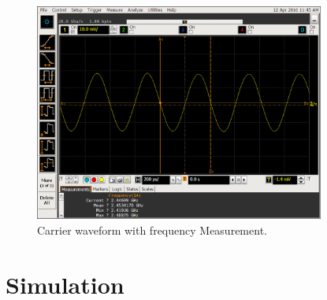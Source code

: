 

\begin{figure}[htbp]
    \centering
    \includegraphics[width=0.85\textwidth]{./figures/oscill_freq}
    \caption{ Carrier waveform with frequency Measurement.
    \label{fig:oscillfreq}}
\end{figure}

%


\section{Simulation}

